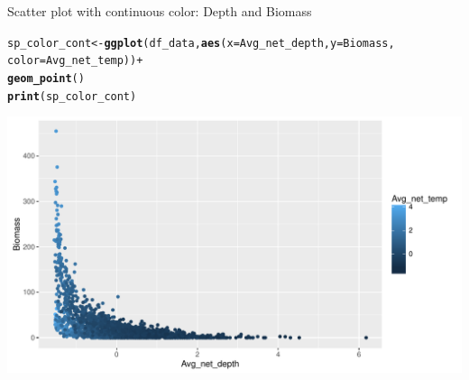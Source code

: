 \documentclass{beamer}\usepackage[]{graphicx}\usepackage[]{color}
\makeatletter
\newcommand{\hlopt}[1]{\textcolor[rgb]{0,0,0}{#1}}%
\newcommand{\hlstd}[1]{\textcolor[rgb]{0.345,0.345,0.345}{#1}}%
\newcommand{\hlkwb}[1]{\textcolor[rgb]{0.69,0.353,0.396}{#1}}%
\newcommand{\hlkwc}[1]{\textcolor[rgb]{0.333,0.667,0.333}{#1}}%
\newcommand{\hlkwd}[1]{\textcolor[rgb]{0.737,0.353,0.396}{\textbf{#1}}}%
\newenvironment{kframe}{%
 \def\at@end@of@kframe{}%
 \ifinner\ifhmode%
  \def\at@end@of@kframe{\end{minipage}}%
  \begin{minipage}{\columnwidth}%
 \fi\fi%
 \def\FrameCommand##1{\hskip\@totalleftmargin \hskip-\fboxsep
 \colorbox{shadecolor}{##1}\hskip-\fboxsep
     \hskip-\linewidth \hskip-\@totalleftmargin \hskip\columnwidth}%
 \MakeFramed {\advance\hsize-\width
   \@totalleftmargin\z@ \linewidth\hsize
   \@setminipage}}%
 {\par\unskip\endMakeFramed%
 \at@end@of@kframe}
\newenvironment{knitrout}{}{} %
\makeatother
\begin{document}
\begin{frame}[fragile]{Scatter plot with continuous color: Depth and Biomass}
\begin{knitrout}\footnotesize
{}\color{fgcolor}\begin{kframe}
\begin{alltt}
\hlstd{sp_color_cont} \hlkwb{<-} \hlkwd{ggplot}\hlstd{(df_data,} \hlkwd{aes}\hlstd{(}\hlkwc{x}\hlstd{=Avg_net_depth,} \hlkwc{y}\hlstd{=Biomass,}
                                     \hlkwc{color}\hlstd{=Avg_net_temp))} \hlopt{+}
  \hlkwd{geom_point}\hlstd{()}
\hlkwd{print}\hlstd{(sp_color_cont)}
\end{alltt}
\end{kframe}

{\centering \includegraphics[width=.9\linewidth]{figure/scatter_plot_color_cont-1} 

}



\end{knitrout}
\end{frame}
\end{document}
